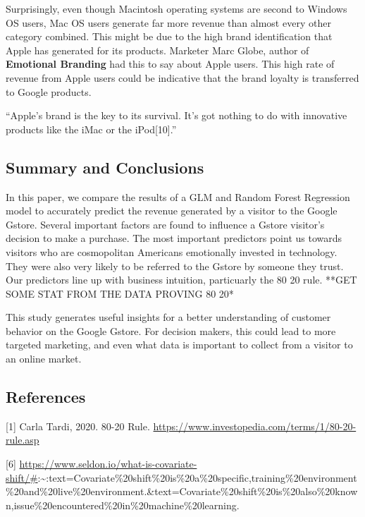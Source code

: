 \documentclass[]{tufte-handout}
\begin{document}
Surprisingly, even though Macintosh operating systems are second to
Windows OS users, Mac OS users generate far more revenue than almost
every other category combined. This might be due to the high brand
identification that Apple has generated for its products. Marketer Marc
Globe, author of \textbf{Emotional Branding} had this to say about Apple
users. This high rate of revenue from Apple users could be indicative
that the brand loyalty is transferred to Google products.

``Apple's brand is the key to its survival. It's got nothing to do with
innovative products like the iMac or the iPod{[}10{]}.''

\hypertarget{summary-and-conclusions}{%
\subsection{Summary and Conclusions}\label{summary-and-conclusions}}

In this paper, we compare the results of a GLM and Random Forest
Regression model to accurately predict the revenue generated by a
visitor to the Google Gstore. Several important factors are found to
influence a Gstore visitor's decision to make a purchase. The most
important predictors point us towards visitors who are cosmopolitan
Americans emotionally invested in technology. They were also very likely
to be referred to the Gstore by someone they trust. Our predictors line
up with business intuition, particuarly the 80 20 rule. **GET SOME STAT
FROM THE DATA PROVING 80 20*

This study generates useful insights for a better understanding of
customer behavior on the Google Gstore. For decision makers, this could
lead to more targeted marketing, and even what data is important to
collect from a visitor to an online market.

\hypertarget{references}{%
\subsection{References}\label{references}}

{[}1{]} Carla Tardi, 2020. 80-20 Rule.
\url{https://www.investopedia.com/terms/1/80-20-rule.asp}

{[}6{]}
\url{https://www.seldon.io/what-is-covariate-shift/\#}:\textasciitilde:text=Covariate\%20shift\%20is\%20a\%20specific,training\%20environment\%20and\%20live\%20environment.\&text=Covariate\%20shift\%20is\%20also\%20known,issue\%20encountered\%20in\%20machine\%20learning.
\end{document}
